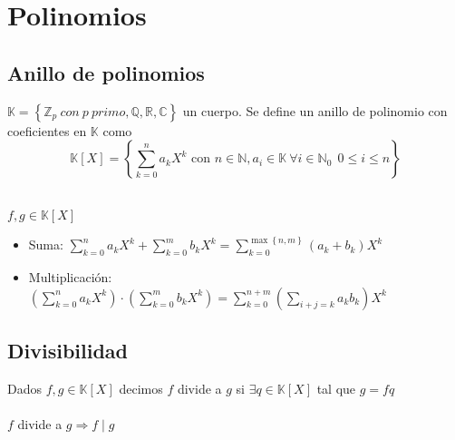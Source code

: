 \documentclass[a4paper,10pt]{article}
\begin{document}
\section{Polinomios}

\subsection{Anillo de polinomios}


 $\mathbb{K} = \left\lbrace \mathbb{Z}_p \ con \ p \ primo,\mathbb{Q},\mathbb{R},\mathbb{C} \right\rbrace$ un cuerpo. Se define un anillo de polinomio con coeficientes en $\mathbb{K}$ como
$$\mathbb{K}[X] = \left\lbrace \sum_{k=0}^{n} {a_k{X^{k}}} \mbox{ con } n \in \mathbb{N}, a_i \in \mathbb{K} \ \forall i \in \mathbb{N}_0 \ \ 0 \leq i \leq n \right\rbrace$$

 \\
$f,g \in \mathbb{K}[X]$
\begin{itemize}
	\item Suma: $\displaystyle \sum_{k=0}^{n} {a_k{X^{k}}} + \sum_{k=0}^{m} {b_k{X^{k}}} = \sum_{k=0}^{\max \left\lbrace n,m \right\rbrace} {(a_k+b_k)X^{k}} $
	\item Multiplicación: $\displaystyle \left( \sum_{k=0}^{n} {a_k{X^{k}}} \right) \cdot \left( \sum_{k=0}^{m} {b_k{X^{k}}} \right) = \sum_{k=0}^{n+m} {\left( {\sum_{i+j=k} {a_k b_k}} \right) X^{k}} $
\end{itemize}


\subsection{Divisibilidad}


 Dados $f,g \in \mathbb{K}[X]$ decimos $f$ divide a $g$ si $\exists q \in \mathbb{K}[X]$ tal que $g = fq$ \\ \\

\notacion $f$ divide a $g \Rightarrow f \mid g$ \\ \\
\end{document}
